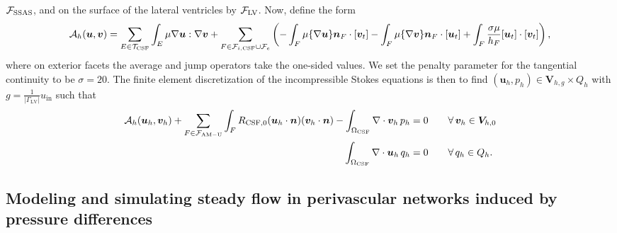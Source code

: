 \documentclass[fleqn,10pt]{wlscirep}
\begin{document}
$\mathcal{F}_{\rm SSAS}$, and on the surface of the lateral ventricles by $\mathcal{F}_{\rm LV}$. Now, define the form 
\begin{multline}
  \mathcal{A}_h(\bm u, \bm v)
  = \sum_{E \in \mathcal{T}_{\rm CSF}} \int_{E} \mu \nabla \bm u : \nabla \bm v
 + \sum_{F \in \mathcal{F}_{i, \rm CSF} \cup \mathcal{F}_{e}} \left (
  -\int_{F} \mu \{\nabla \bm u\}  \bm n_F \cdot [\bm v_t] 
  - %
  \int_{F} \mu \{\nabla \bm v\}  \bm n_F \cdot [\bm u_t]
  + %
\int_{F}   \frac{\sigma \mu}{h_F} [\bm u_t ] \cdot [\bm v_t] \right ),   
\end{multline}
where on exterior facets the average and jump operators take the one-sided values. We set the penalty parameter for the tangential continuity to be $\sigma = 20$. The finite element discretization of the incompressible Stokes equations is then to find $(\bm u_h, p_h) \in \bm V_{h,g} \times Q_h$ with $g  = \frac{1}{|\Gamma_{\mathrm{LV}}|} u_{\mathrm{in}}$  such that 
\begin{subequations}
\begin{align}
  \mathcal{A}_h(\bm u_h, \bm v_h)
  + \sum_{F \in \mathcal{F}_{\rm AM-U}} \int_{F} R_{\rm CSF, 0} (\bm u_h \cdot \bm n) (\bm v_h \cdot \bm n)
  - \int_{\Omega_{\rm CSF}} \nabla \cdot \bm v_h \, p_h  &= 0 \qquad \forall \, \bm v_h \in \bm V_{h,0} \\ 
\int_{\Omega_{\rm CSF}} \nabla \cdot \bm u_h \, q_h  &= 0 \qquad \forall \, q_h \in Q_h.
\end{align}
\end{subequations}


\subsection{Modeling and simulating steady flow in perivascular networks induced by pressure differences}
\label{sec:app:hydraulic_network}
\end{document}
